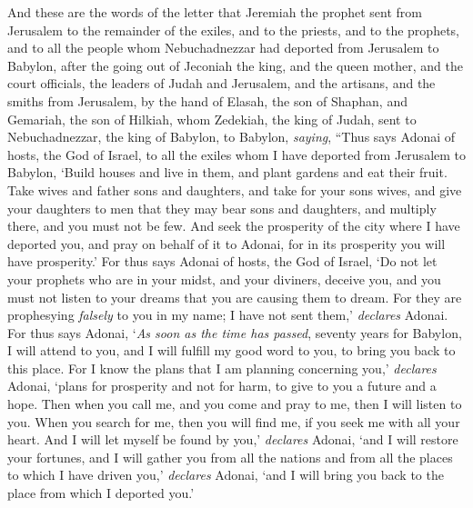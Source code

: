\begin{biblechapter} %
 And these are the words of the letter that Jeremiah the prophet sent from Jerusalem to the remainder of the exiles, and to the priests, and to the prophets, and to all the people whom Nebuchadnezzar had deported from Jerusalem to Babylon,
\verse after the going out of Jeconiah the king, and the queen mother, and the court officials, the leaders of Judah and Jerusalem, and the artisans, and the smiths from Jerusalem,
\verse by the hand of Elasah, the son of Shaphan, and Gemariah, the son of Hilkiah, whom Zedekiah, the king of Judah, sent to Nebuchadnezzar, the king of Babylon, to Babylon, \textit{saying},
\verse “Thus says Adonai of hosts, the God of Israel, to all the exiles whom I have deported from Jerusalem to Babylon,
\verse ‘Build houses and live in them, and plant gardens and eat their fruit.
\verse Take wives and father sons and daughters, and take for your sons wives, and give your daughters to men that they may bear sons and daughters, and multiply there, and you must not be few.
\verse And seek the prosperity of the city where I have deported you, and pray on behalf of it to Adonai, for in its prosperity you will have prosperity.’
\verse For thus says Adonai of hosts, the God of Israel, ‘Do not let your prophets who are in your midst, and your diviners, deceive you, and you must not listen to your dreams that you are causing them to dream.
\verse For they are prophesying \textit{falsely} to you in my name; I have not sent them,’ \textit{declares} Adonai.
\verse For thus says Adonai, ‘\textit{As soon as the time has passed}, seventy years for Babylon, I will attend to you, and I will fulfill my good word to you, to bring you back to this place.
\verse For I know the plans that I am planning concerning you,’ \textit{declares} Adonai, ‘plans for prosperity and not for harm, to give to you a future and a hope.
\verse Then when you call me, and you come and pray to me, then I will listen to you.
\verse When you search for me, then you will find me, if you seek me with all your heart.
\verse And I will let myself be found by you,’ \textit{declares} Adonai, ‘and I will restore your fortunes, and I will gather you from all the nations and from all the places to which I have driven you,’ \textit{declares} Adonai, ‘and I will bring you back to the place from which I deported you.’

\end{biblechapter}
